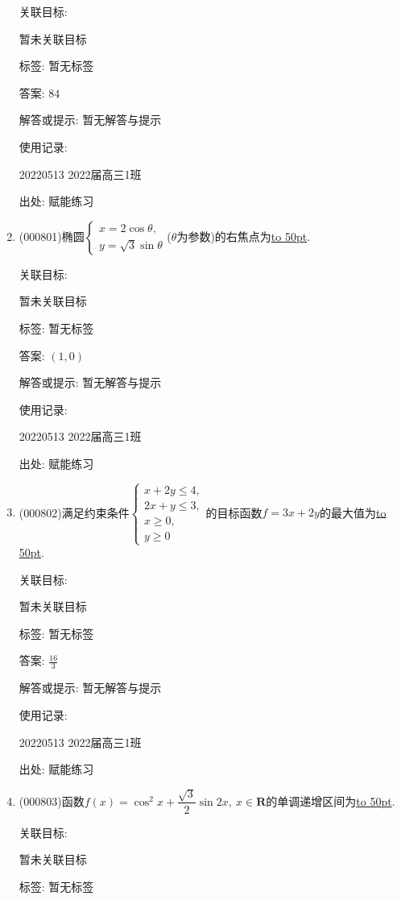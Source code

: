 \documentclass[10pt,a4paper]{article}
\newcommand{\blank}[1]{\underline{\hbox to #1pt{}}}
\begin{document}
\begin{enumerate}[1.]
关联目标:

暂未关联目标



标签: 暂无标签

答案: $84$

解答或提示: 暂无解答与提示

使用记录:

20220513	2022届高三1班	


出处: 赋能练习
\item { (000801)}椭圆$\begin{cases} x=2 \cos\theta, \\ y=\sqrt3\sin\theta  \end{cases}$($\theta$为参数)的右焦点为\blank{50}.


关联目标:

暂未关联目标



标签: 暂无标签

答案: $(1,0)$

解答或提示: 暂无解答与提示

使用记录:

20220513	2022届高三1班	


出处: 赋能练习
\item { (000802)}满足约束条件$\begin{cases} x+2y\le 4, \\ 2x+y\le 3, \\ x\ge 0, \\ y\ge 0 \end{cases}$的目标函数$f=3x+2y$的最大值为\blank{50}.


关联目标:

暂未关联目标



标签: 暂无标签

答案: $\frac{16}3$

解答或提示: 暂无解答与提示

使用记录:

20220513	2022届高三1班	


出处: 赋能练习
\item { (000803)}函数$f(x)=\cos^2 x+\dfrac{\sqrt3}2\sin 2x,\ x\in \mathbf{R}$的单调递增区间为\blank{50}.


关联目标:

暂未关联目标



标签: 暂无标签


\end{enumerate}
\end{document}
